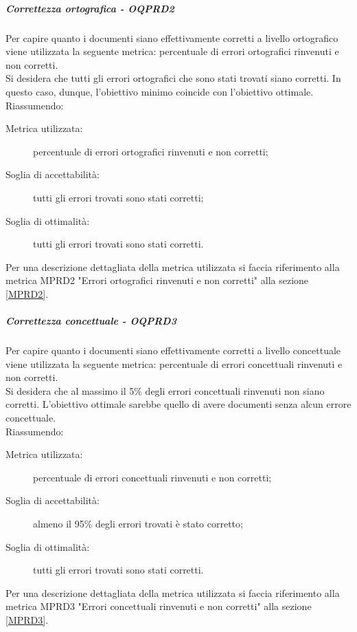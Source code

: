 \documentclass[../PianoDiQualifica.tex]{subfiles}
\begin{document}
				\subparagraph{Correttezza ortografica - OQPRD2}
				Per capire quanto i documenti siano effettivamente corretti a livello ortografico viene utilizzata la seguente metrica: percentuale di errori ortografici rinvenuti e non corretti.\\
				Si desidera che tutti gli errori ortografici che sono stati trovati siano corretti. In questo caso, dunque, l'obiettivo minimo coincide con l’obiettivo ottimale.\\
				Riassumendo:
				\begin{description}
					\item[Metrica utilizzata:] percentuale di errori ortografici rinvenuti e non corretti;
					\item[Soglia di accettabilità:] tutti gli errori trovati sono stati corretti;
					\item[Soglia di ottimalità:] tutti gli errori trovati sono stati corretti.
				\end{description}
				Per una descrizione dettagliata della metrica utilizzata si faccia riferimento alla metrica MPRD2 "Errori ortografici rinvenuti e non corretti" alla sezione \ref{MPRD2}.
				
				\subparagraph{Correttezza concettuale - OQPRD3}
				Per capire quanto i documenti siano effettivamente corretti a livello concettuale viene utilizzata la seguente metrica: percentuale di errori concettuali rinvenuti e non corretti.\\
				Si desidera che al massimo il 5\% degli errori concettuali rinvenuti non siano corretti. L’obiettivo ottimale sarebbe quello di avere documenti senza alcun errore concettuale.\\
				Riassumendo:
				\begin{description}
					\item[Metrica utilizzata:] percentuale di errori concettuali rinvenuti e non corretti;
					\item[Soglia di accettabilità:] almeno il 95\% degli errori trovati è stato corretto;
					\item[Soglia di ottimalità:] tutti gli errori trovati sono stati corretti.
				\end{description}
				Per una descrizione dettagliata della metrica utilizzata si faccia riferimento alla metrica MPRD3 "Errori concettuali rinvenuti e non corretti" alla sezione \ref{MPRD3}.
			
\end{document}
